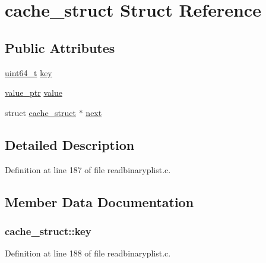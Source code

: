 \hypertarget{structcache__struct}{}\section{cache\+\_\+struct Struct Reference}
\label{structcache__struct}
\subsection*{Public Attributes}
\begin{DoxyCompactItemize}
\item 
\hyperlink{lib-src_2ffmpeg_2win32_2stdint_8h_aec6fcb673ff035718c238c8c9d544c47}{uint64\+\_\+t} \hyperlink{structcache__struct_af242c8abd9d0d23e8fb7b8c0809fa598}{key}
\item 
\hyperlink{readbinaryplist_8h_a21b1bc18d01f9cead32cfa83bb0c9501}{value\+\_\+ptr} \hyperlink{structcache__struct_aafd2fa83cd12c368a8c1ecfe71c7eb2c}{value}
\item 
struct \hyperlink{structcache__struct}{cache\+\_\+struct} $\ast$ \hyperlink{structcache__struct_a83ba7f55c16385762f41cb542f461dda}{next}
\end{DoxyCompactItemize}


\subsection{Detailed Description}


Definition at line 187 of file readbinaryplist.\+c.



\subsection{Member Data Documentation}
\subsubsection[{\texorpdfstring{key}{key}}]{ cache\+\_\+struct\+::key}\hypertarget{structcache__struct_af242c8abd9d0d23e8fb7b8c0809fa598}{}\label{structcache__struct_af242c8abd9d0d23e8fb7b8c0809fa598}


Definition at line 188 of file readbinaryplist.\+c.

